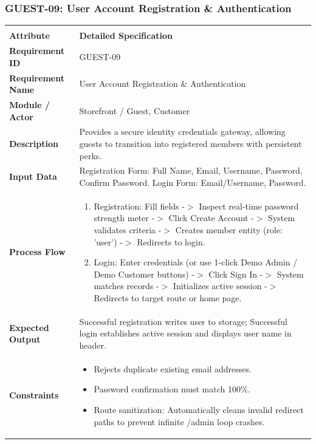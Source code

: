 \documentclass[12pt,a4paper,oneside]{report}
\begin{document}
\subsubsection{GUEST-09: User Account Registration \& Authentication}
\begin{longtable}{|p{3.6cm}|p{11.9cm}|}
\hline
\rowcolor{PrimaryBrown}
\multicolumn{2}{|p{15.5cm}|}{\textbf{\textcolor{white}{Functional Specification: GUEST-09 -- User Account Registration \& Authentication}}} \\
\hline
\endfirsthead
\hline
\rowcolor{PrimaryBrown}
\multicolumn{2}{|p{15.5cm}|}{\textbf{\textcolor{white}{Functional Specification: GUEST-09 (Continued)}}} \\
\hline
\textbf{Attribute} & \textbf{Detailed Specification} \\
\hline
\endhead
\hline
\endfoot
\textbf{Requirement ID} & GUEST-09 \\
\hline
\textbf{Requirement Name} & User Account Registration \& Authentication \\
\hline
\textbf{Module / Actor} & Storefront / Guest, Customer \\
\hline
\textbf{Description} & Provides a secure identity credentials gateway, allowing guests to transition into registered members with persistent perks. \\
\hline
\textbf{Input Data} & Registration Form: Full Name, Email, Username, Password, Confirm Password.
Login Form: Email/Username, Password. \\
\hline
\textbf{Process Flow} & \begin{enumerate}[leftmargin=*,nosep,topsep=2pt]
  \item Registration: Fill fields -$>$ Inspect real-time password strength meter -$>$ Click Create Account -$>$ System validates criteria -$>$ Creates member entity (role: 'user') -$>$ Redirects to login.
  \item Login: Enter credentials (or use 1-click Demo Admin / Demo Customer buttons) -$>$ Click Sign In -$>$ System matches records -$>$ Initializes active session -$>$ Redirects to target route or home page.
\end{enumerate} \\
\hline
\textbf{Expected Output} & Successful registration writes user to storage; Successful login establishes active session and displays user name in header. \\
\hline
\textbf{Constraints} & \begin{itemize}[leftmargin=*,nosep,topsep=2pt]
  \item Rejects duplicate existing email addresses.
  \item Password confirmation must match 100\%.
  \item Route sanitization: Automatically cleans invalid redirect paths to prevent infinite /admin loop crashes.
\end{itemize} \\
\hline
\end{longtable}
\end{document}
